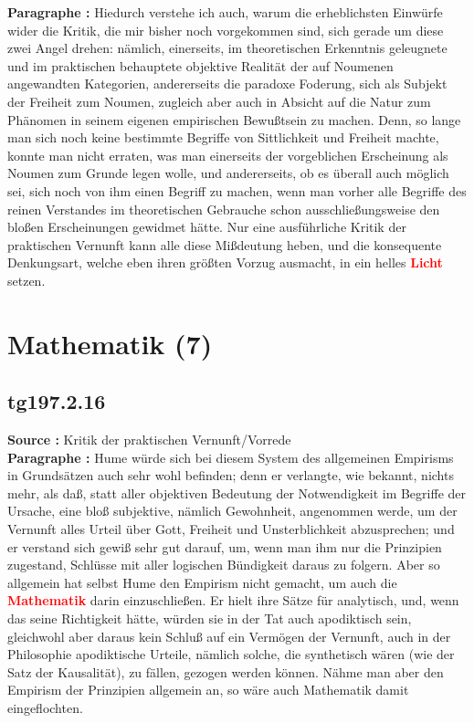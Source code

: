 \documentclass[a4paper,12pt,twoside]{book}
\newcommand{\match}[1]{\textcolor{red}{\textbf{#1}}}
\newcommand{\unnumberedsection}[1]{
	\section*{#1}
	\addcontentsline{toc}{section}{#1}
	\markright{#1}
}
\begin{document}
	\textbf{Paragraphe : }
	Hiedurch verstehe ich auch, warum die erheblichsten Einwürfe wider die Kritik, die mir bisher noch vorgekommen sind, sich gerade um diese zwei Angel drehen: nämlich, einerseits, im theoretischen Erkenntnis geleugnete und im praktischen behauptete objektive Realität der auf Noumenen angewandten Kategorien, andererseits die paradoxe Foderung, sich als Subjekt der Freiheit zum Noumen, zugleich aber auch in Absicht auf die Natur zum Phänomen in seinem eigenen empirischen Bewußtsein zu machen. Denn, so lange man sich noch keine bestimmte Begriffe von Sittlichkeit und Freiheit machte, konnte man nicht erraten, was man einerseits der vorgeblichen Erscheinung als Noumen zum Grunde legen wolle, und andererseits, ob es überall auch möglich sei, sich noch von ihm einen Begriff zu machen, wenn man vorher alle Begriffe des reinen Verstandes im theoretischen Gebrauche schon ausschließungsweise den bloßen Erscheinungen gewidmet hätte. Nur eine ausführliche Kritik der praktischen Vernunft kann alle diese Mißdeutung heben, und die konsequente Denkungsart, welche eben ihren größten Vorzug ausmacht, in ein helles \match{Licht} setzen. 
	
	\unnumberedsection{Mathematik (7)} 
	\subsection*{tg197.2.16} 
	\textbf{Source : }Kritik der praktischen Vernunft/Vorrede\\  
	
	\textbf{Paragraphe : }
	Hume würde sich bei diesem System des allgemeinen Empirisms in Grundsätzen auch sehr wohl befinden; denn er verlangte, wie bekannt, nichts mehr, als daß, statt aller objektiven Bedeutung der Notwendigkeit im Begriffe der Ursache, eine bloß subjektive, nämlich Gewohnheit, angenommen werde, um der Vernunft alles Urteil über Gott, Freiheit und Unsterblichkeit abzusprechen; und er verstand sich gewiß sehr gut darauf, um, wenn man ihm nur die Prinzipien zugestand, Schlüsse mit aller logischen Bündigkeit daraus zu folgern. Aber so allgemein hat selbst Hume den Empirism nicht gemacht, um auch die \match{Mathematik} darin einzuschließen. Er hielt ihre Sätze für analytisch, und, wenn das seine Richtigkeit hätte, würden sie in der Tat auch apodiktisch sein, gleichwohl aber daraus kein Schluß auf ein Vermögen der Vernunft, auch in der Philosophie apodiktische Urteile, nämlich solche, die synthetisch wären (wie der Satz der Kausalität), zu fällen, gezogen werden können. Nähme man aber den Empirism der Prinzipien allgemein an, so wäre auch Mathematik damit eingeflochten. 
	
\end{document}
